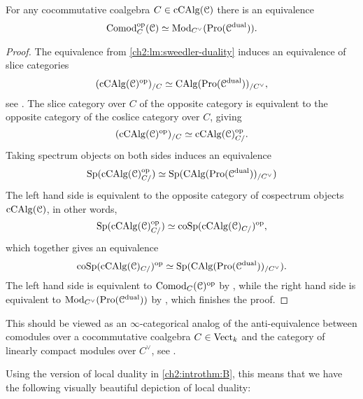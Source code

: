 \begin{proposition}
    \label{ch2:prop:comodules-and-promodules}
    For any cocommutative coalgebra $C\in \operatorname{cCAlg}(\EuScript{C})$ there is an equivalence 
    \[\mathrm{Comod}^{\mathrm{op}}_C(\EuScript{C})\simeq \mathrm{Mod}_{C^\vee}(\operatorname{Pro}(\EuScript{C}^{\mathrm{dual}})).\]  
\end{proposition}
\begin{proof}
    The equivalence from \cref{ch2:lm:sweedler-duality} induces an equivalence of slice categories 
    \[(\operatorname{cCAlg}(\EuScript{C})^{\mathrm{op}})_{/C}\simeq \operatorname{CAlg}(\operatorname{Pro}(\EuScript{C}^{\mathrm{dual}}))_{/C^\vee},\]
    see \cite[5.2.5.1]{lurie_09}. The slice category over $C$ of the opposite category is equivalent to the opposite category of the coslice category over $C$, giving 
    \[(\operatorname{cCAlg}(\EuScript{C})^{\mathrm{op}})_{/C} \simeq \operatorname{cCAlg}(\EuScript{C})^{\mathrm{op}}_{C/}.\]
    Taking spectrum objects on both sides induces an equivalence
    \[\mathrm{Sp}(\operatorname{cCAlg}(\EuScript{C})_{C/}^{\mathrm{op}})\simeq \mathrm{Sp}(\operatorname{CAlg}(\operatorname{Pro}(\EuScript{C}^{\mathrm{dual}}))_{/C^\vee})\]
    The left hand side is equivalent to the opposite category of cospectrum objects $\operatorname{cCAlg}(\EuScript{C})$, in other words, 
    \[\mathrm{Sp}(\operatorname{cCAlg}(\EuScript{C})_{C/}^{\mathrm{op}})\simeq \mathrm{coSp}(\operatorname{cCAlg}(\EuScript{C})_{C/})^{\mathrm{op}},\]
    which together gives an equivalence
    \[\mathrm{coSp}(\operatorname{cCAlg}(\EuScript{C})_{C/})^{\mathrm{op}} \simeq \mathrm{Sp}(\operatorname{CAlg}(\operatorname{Pro}(\EuScript{C}^{\mathrm{dual}}))_{/C^\vee}).\]
    The left hand side is equivalent to $\mathrm{Comod}_C(\EuScript{C})^{\mathrm{op}}$ by \cite[1.0.3]{chen_2024}, while the right hand side is equivalent to $\mathrm{Mod}_{C^\vee}(\operatorname{Pro}(\EuScript{C}^{\mathrm{dual}}))$ by \cite[7.3.4.13]{Lurie_HA}, which finishes the proof.  
\end{proof}

\begin{remark}
    This should be viewed as an $\infty$-categorical analog of the anti-equivalence between comodules over a cocommutative coalgebra $C\in \mathrm{Vect}_k$ and the category of linearly compact modules over $C^\vee$, see \cite[II.29]{lefschetz_1942}. 
\end{remark}

Using the version of local duality in \cref{ch2:introthm:B}, this means that we have the following visually beautiful depiction of local duality: 

\begin{center}
\end{center}

